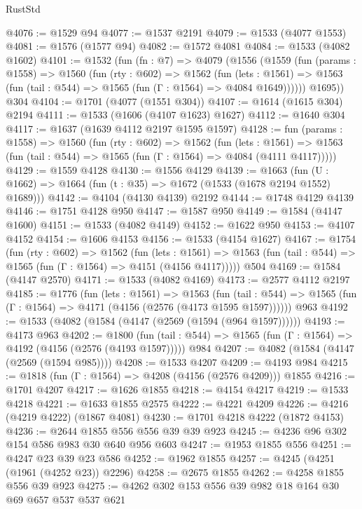\begin{lexlean}{RustStd}
\begin{coremodule}
@4076 := @1529 @94
@4077 := @1537 @2191
@4079 := @1533 (@4077 @1553)
@4081 := @1576 (@1577 @94)
@4082 := @1572 @4081
@4084 := @1533 (@4082 @1602)
@4101 := @1532
    (fun (fn : @7) =>
    @4079
      (@1556
        (@1559
          (fun (params : @1558) =>
          @1560
            (fun (rty : @602) =>
            @1562
              (fun (lets : @1561) =>
              @1563 (fun (tail : @544) => @1565 (fun (Γ : @1564) => @4084 @1649))))))
        @1695))
    @304
@4104 := @1701 (@4077 (@1551 @304))
@4107 := @1614 (@1615 @304) @2194
@4111 := @1533 (@1606 (@4107 @1623) @1627)
@4112 := @1640 @304
@4117 := @1637 (@1639 @4112 @2197 @1595 @1597)
@4128 := fun (params : @1558) =>
  @1560
    (fun (rty : @602) =>
    @1562
      (fun (lets : @1561) =>
      @1563 (fun (tail : @544) => @1565 (fun (Γ : @1564) => @4084 (@4111 @4117)))))
@4129 := @1559 @4128
@4130 := @1556 @4129
@4139 := @1663 (fun (U : @1662) => @1664 (fun (t : @35) => @1672 (@1533 (@1678 @2194 @1552) @1689)))
@4142 := @4104 (@4130 @4139) @2192
@4144 := @1748 @4129 @4139
@4146 := @1751 @4128 @950
@4147 := @1587 @950
@4149 := @1584 (@4147 @1600)
@4151 := @1533 (@4082 @4149)
@4152 := @1622 @950
@4153 := @4107 @4152
@4154 := @1606 @4153
@4156 := @1533 (@4154 @1627)
@4167 := @1754
    (fun (rty : @602) =>
    @1562
      (fun (lets : @1561) =>
      @1563 (fun (tail : @544) => @1565 (fun (Γ : @1564) => @4151 (@4156 @4117)))))
    @504
@4169 := @1584 (@4147 @2570)
@4171 := @1533 (@4082 @4169)
@4173 := @2577 @4112 @2197
@4185 := @1776
    (fun (lets : @1561) =>
    @1563
      (fun (tail : @544) => @1565 (fun (Γ : @1564) => @4171 (@4156 (@2576 (@4173 @1595 @1597))))))
    @963
@4192 := @1533 (@4082 (@1584 (@4147 (@2569 (@1594 (@964 @1597))))))
@4193 := @4173 @963
@4202 := @1800
    (fun (tail : @544) => @1565 (fun (Γ : @1564) => @4192 (@4156 (@2576 (@4193 @1597)))))
    @984
@4207 := @4082 (@1584 (@4147 (@2569 (@1594 @985))))
@4208 := @1533 @4207
@4209 := @4193 @984
@4215 := @1818 (fun (Γ : @1564) => @4208 (@4156 (@2576 @4209))) @1855
@4216 := @1701 @4207
@4217 := @1626 @1855
@4218 := @4154 @4217
@4219 := @1533 @4218
@4221 := @1633 @1855 @2575
@4222 := @4221 @4209
@4226 := @4216 (@4219 @4222) (@1867 @4081)
@4230 := @1701 @4218 @4222 (@1872 @4153)
@4236 := @2644 @1855 @556 @556 @39 @39 @923
@4245 := @4236 @96 @302 @154 @586 @983 @30 @640 @956 @603
@4247 := @1953 @1855 @556
@4251 := @4247 @23 @39 @23 @586
@4252 := @1962 @1855
@4257 := @4245 (@4251 (@1961 (@4252 @23)) @2296)
@4258 := @2675 @1855
@4262 := @4258 @1855 @556 @39 @923
@4275 := @4262 @302 @153 @556 @39 @982 @18 @164 @30 @69 @657 @537 @537 @621

\end{coremodule}
\end{lexlean}
